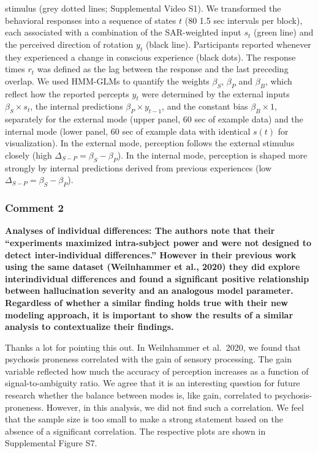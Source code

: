 \documentclass[
]{article}
\begin{document}
\begin{itemize}
{  stimulus (grey dotted lines; Supplemental Video S1). We transformed
  the behavioral responses into a sequence of states \(t\) (80 1.5 sec
  intervals per block), each associated with a combination of the
  SAR-weighted input \(s_t\) (green line) and the perceived direction of
  rotation \(y_t\) (black line). Participants reported whenever they
  experienced a change in conscious experience (black dots). The
  response times \(r_t\) was defined as the lag between the response and
  the last preceding overlap. We used HMM-GLMs to quantify the weights
  \(\beta_S\), \(\beta_P\) and \(\beta_B\), which reflect how the
  reported percepts \(y_t\) were determined by the external inputs
  \(\beta_S \times s_t\), the internal predictions
  \(\beta_P \times y_{t-1}\), and the constant bias
  \(\beta_B \times 1\), separately for the external mode (upper panel,
  60 sec of example data) and the internal mode (lower panel, 60 sec of
  example data with identical \(s(t)\) for visualization). In the
  external mode, perception follows the external stimulus closely (high
  \(\Delta_{S-P} = \beta_S - \beta_P\)). In the internal mode,
  perception is shaped more strongly by internal predictions derived
  from previous experiences (low \(\Delta_{S-P} = \beta_S - \beta_P\)).}
\end{itemize}

\subsubsection{Comment 2}\label{comment-2-3}

\textbf{Analyses of individual differences: The authors note that their
``experiments maximized intra-subject power and were not designed to
detect inter-individual differences.'' However in their previous work
using the same dataset (Weilnhammer et al., 2020) they did explore
interindividual differences and found a significant positive
relationship between hallucination severity and an analogous model
parameter. Regardless of whether a similar finding holds true with their
new modeling approach, it is important to show the results of a similar
analysis to contextualize their findings.}

Thanks a lot for pointing this out. In Weilnhammer et al.~2020, we found
that psychosis proneness correlated with the gain of sensory processing.
The gain variable reflected how much the accuracy of perception
increases as a function of signal-to-ambiguity ratio. We agree that it
is an interesting question for future research whether the balance
between modes is, like gain, correlated to psychosis-proneness. However,
in this analysis, we did not find such a correlation. We feel that the
sample size is too small to make a strong statement based on the absence
of a significant correlation. The respective plots are shown in
Supplemental Figure S7.
\end{document}
